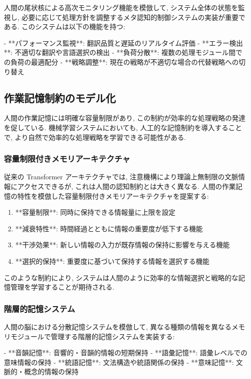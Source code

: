 人間の尾状核による高次モニタリング機能を模倣して, システム全体の状態を監視し, 必要に応じて処理方針を調整するメタ認知的制御システムの実装が重要である.
このシステムは以下の機能を持つ:

- **パフォーマンス監視**: 翻訳品質と遅延のリアルタイム評価
- **エラー検出**: 不適切な翻訳や言語選択の検出
- **負荷分散**: 複数の処理モジュール間での負荷の最適配分
- **戦略調整**: 現在の戦略が不適切な場合の代替戦略への切り替え

\subsection{作業記憶制約のモデル化}

人間の作業記憶には明確な容量制限があり, この制約が効率的な処理戦略の発達を促している.
機械学習システムにおいても, 人工的な記憶制約を導入することで, より自然で効率的な処理戦略を学習できる可能性がある.

\subsubsection{容量制限付きメモリアーキテクチャ}

従来の Transformer アーキテクチャでは, 注意機構により理論上無制限の文脈情報にアクセスできるが, これは人間の認知制約とは大きく異なる.
人間の作業記憶の特性を模倣した容量制限付きメモリアーキテクチャを提案する:

\begin{enumerate}
\item **容量制限**: 同時に保持できる情報量に上限を設定
\item **減衰特性**: 時間経過とともに情報の重要度が低下する機能
\item **干渉効果**: 新しい情報の入力が既存情報の保持に影響を与える機能
\item **選択的保持**: 重要度に基づいて保持する情報を選択する機能
\end{enumerate}

このような制約により, システムは人間のように効率的な情報選択と戦略的な記憶管理を学習することが期待される.

\subsubsection{階層的記憶システム}

人間の脳における分散記憶システムを模倣して, 異なる種類の情報を異なるメモリモジュールで管理する階層的記憶システムを実装する:

- **音韻記憶**: 音響的・音韻的情報の短期保持
- **語彙記憶**: 語彙レベルでの意味情報の保持
- **統語記憶**: 文法構造や統語関係の保持  
- **意味記憶**: 文脈的・概念的情報の保持

